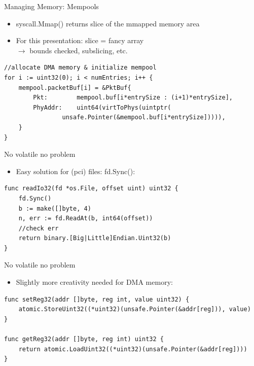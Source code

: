 \documentclass[NET,english,aspectratio=169,notitleframe,draft]{tumbeamer}
\begin{document}
\begin{frame}[fragile]{Managing Memory: Mempools}
\begin{itemize}
\item syscall.Mmap() returns slice of the mmapped memory area
\item For this presentation: slice = fancy array\\
	$\rightarrow$ bounds checked, subslicing, etc.
\end{itemize}

\begin{verbatim}
//allocate DMA memory & initialize mempool
for i := uint32(0); i < numEntries; i++ {
	mempool.packetBuf[i] = &PktBuf{
		Pkt:        mempool.buf[i*entrySize : (i+1)*entrySize],
		PhyAddr:    uint64(virtToPhys(uintptr(
			    unsafe.Pointer(&mempool.buf[i*entrySize])))),
	}
}
\end{verbatim}
\end{frame}

\begin{frame}[fragile]{No volatile no problem}
\begin{itemize}
\item Easy solution for (pci) files: fd.Sync():
\end{itemize}
\begin{verbatim}
func readIo32(fd *os.File, offset uint) uint32 {
	fd.Sync()
	b := make([]byte, 4)
	n, err := fd.ReadAt(b, int64(offset))
	//check err
	return binary.[Big|Little]Endian.Uint32(b)
}
\end{verbatim}
\end{frame}

\begin{frame}[fragile]{No volatile no problem}
\begin{itemize}
\item Slightly more creativity needed for DMA memory:
\end{itemize}
\begin{verbatim}
func setReg32(addr []byte, reg int, value uint32) {
	atomic.StoreUint32((*uint32)(unsafe.Pointer(&addr[reg])), value)
}

func getReg32(addr []byte, reg int) uint32 {
	return atomic.LoadUint32((*uint32)(unsafe.Pointer(&addr[reg])))
}
\end{verbatim}
\end{frame}
\end{document}
